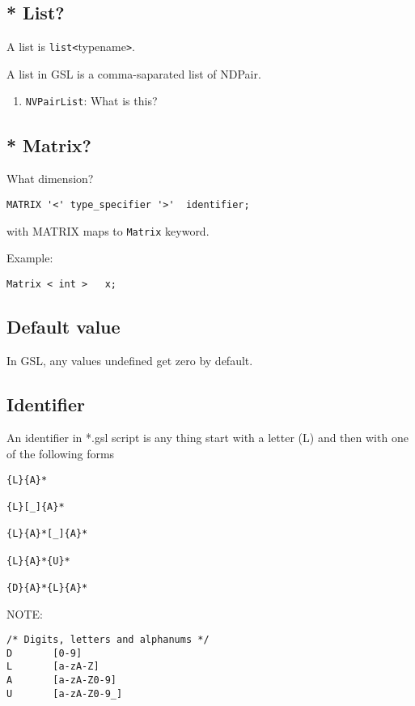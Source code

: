 \subsection{* List?}
\label{sec:list-GSL}

A list is \verb!list<!typename\verb!>!.

A list in GSL is a comma-saparated list of NDPair.

\begin{enumerate}
  \item \verb!NVPairList!: What is this?

\end{enumerate}

\subsection{* Matrix?}

What dimension?

\begin{verbatim}
MATRIX '<' type_specifier '>'  identifier;
\end{verbatim}
with MATRIX maps to \verb!Matrix! keyword.

Example:
\begin{verbatim}
Matrix < int >   x;
\end{verbatim}

\subsection{Default value}

In GSL, any values undefined get zero by default.


\subsection{Identifier}

An identifier in *.gsl script is any thing start with a letter (L) and then with
one of the following forms
\begin{verbatim}
{L}{A}*

{L}[_]{A}*

{L}{A}*[_]{A}*

{L}{A}*{U}*

{D}{A}*{L}{A}*
\end{verbatim}

NOTE:
\begin{verbatim}
/* Digits, letters and alphanums */
D       [0-9]
L       [a-zA-Z]
A       [a-zA-Z0-9]
U       [a-zA-Z0-9_]
\end{verbatim}

